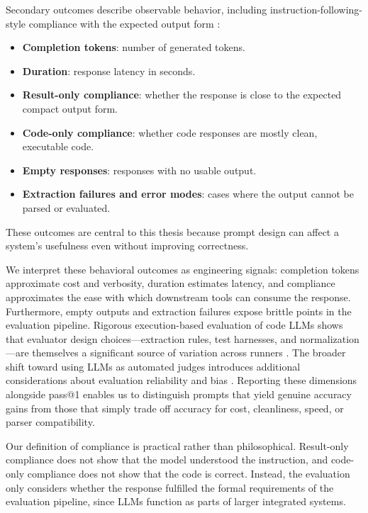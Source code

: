 Secondary outcomes describe observable behavior, including instruction-following-style compliance with the expected output form \cite{zhou2023ifeval}:

\begin{itemize}
\tightlist
\item
 \textbf{Completion tokens}: number of generated tokens.
\item
 \textbf{Duration}: response latency in seconds.
\item
 \textbf{Result-only compliance}: whether the response is close to the expected compact output form.
\item
 \textbf{Code-only compliance}: whether code responses are mostly clean, executable code.
\item
 \textbf{Empty responses}: responses with no usable output.
\item
 \textbf{Extraction failures and error modes}: cases where the output cannot be parsed or evaluated.
\end{itemize}

These outcomes are central to this thesis because prompt design can affect a system's usefulness even without improving correctness.

We interpret these behavioral outcomes as engineering signals: completion tokens approximate cost and verbosity, duration estimates latency, and compliance approximates the ease with which downstream tools can consume the response. Furthermore, empty outputs and extraction failures expose brittle points in the evaluation pipeline. Rigorous execution-based evaluation of code LLMs shows that evaluator design choices---extraction rules, test harnesses, and normalization---are themselves a significant source of variation across runners \cite{liu2023nece}. The broader shift toward using LLMs as automated judges introduces additional considerations about evaluation reliability and bias \cite{li2025llmjudge}. Reporting these dimensions alongside pass@1 enables us to distinguish prompts that yield genuine accuracy gains from those that simply trade off accuracy for cost, cleanliness, speed, or parser compatibility.

Our definition of compliance is practical rather than philosophical. Result-only compliance does not show that the model understood the instruction, and code-only compliance does not show that the code is correct. Instead, the evaluation only considers whether the response fulfilled the formal requirements of the evaluation pipeline, since LLMs function as parts of larger integrated systems.
